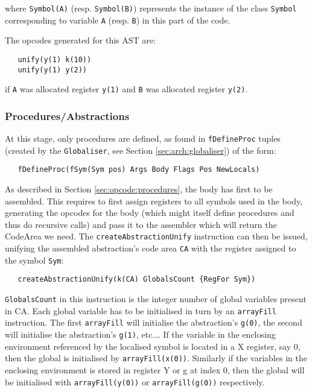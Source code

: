 \documentclass[a4paper]{memoir}
\begin{document}
where \lstinline!Symbol(A)! (resp. \lstinline!Symbol(B)!) represents the instance of the class \lstinline!Symbol! corresponding to variable \lstinline!A! (resp. \lstinline!B!) in this part of the code. 

The opcodes generated for this AST are:

\begin{lstlisting}
   unify(y(1) k(10))
   unify(y(1) y(2))
\end{lstlisting}
if \lstinline!A! was allocated register \lstinline!y(1)! and \lstinline!B! was
allocated register \lstinline!y(2)!.


\subsubsection{Procedures/Abstractions}\label{sec:codegen:procedures}
At this stage, only procedures are defined, as found in \lstinline!fDefineProc! tuples (created by the \lstinline!Globaliser!, see Section \ref{sec:arch:globaliser}) of the form:
\begin{lstlisting}
   fDefineProc(fSym(Sym pos) Args Body Flags Pos NewLocals)
\end{lstlisting}
As described in Section \ref{sec:opcode:procedures}, the body has first to be assembled. This requires to first assign registers to all symbols used in the body, generating the opcodes for the body (which might itself define procedures and thus do recursive calls) and pass it to the assembler which will return the CodeArea we need.
The \lstinline!createAbstractionUnify! instruction can then be issued, unifying the assembled abstraction's code area \lstinline!CA! with the register assigned to the symbol \lstinline!Sym!:
\begin{lstlisting}
   createAbstractionUnify(k(CA) GlobalsCount {RegFor Sym})
\end{lstlisting}
\lstinline!GlobalsCount! in this instruction is the integer number of global variables present in CA. Each global variable has to be initialised in turn by an \lstinline!arrayFill! instruction. The first \lstinline!arrayFill! will initialise the abstraction's \lstinline!g(0)!, the second will initialise the abstraction's \lstinline!g(1)!, etc.\ldots
If the variable in the enclosing environment referenced by the localised symbol
is located in a X register, say 0, then the global is initialised by
\lstinline!arrayFill(x(0))!. Similarly if the variables in the enclosing
environment is stored in register Y or g at index 0, then the global will be
initialised with \lstinline!arrayFill(y(0))! or \lstinline!arrayFill(g(0))! respectively.
\end{document}
